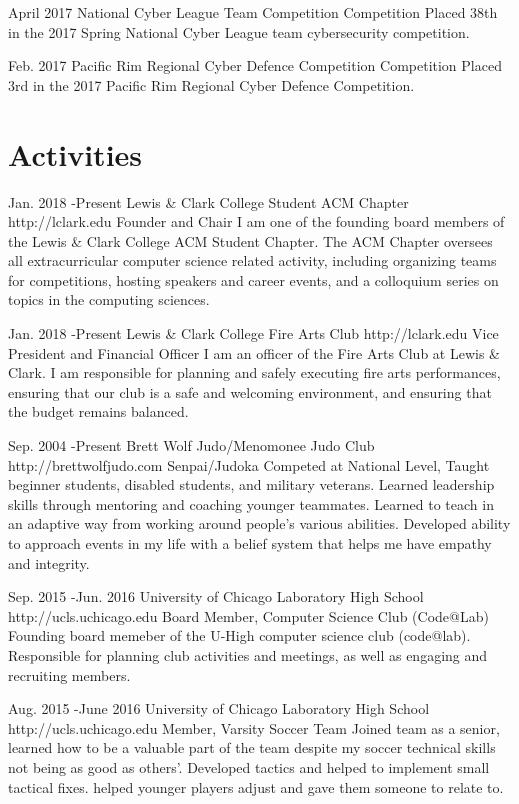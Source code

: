 \documentclass[10pt]{article} %
\begin{document}
\award
{April 2017}
{ }
{National Cyber League Team Competition}
{}
{Competition}
{Placed 38th in the 2017 Spring National Cyber League team cybersecurity competition.}

\award
{Feb. 2017}
{ }
{Pacific Rim Regional Cyber Defence Competition}
{}
{Competition}
{Placed 3rd in the 2017 Pacific Rim Regional Cyber Defence Competition.}

\section{Activities}
\activity
{Jan. 2018 -}{Present}
{Lewis \& Clark College Student ACM Chapter}
{http://lclark.edu}
{Founder and Chair}
{I am one of the founding board members of the Lewis \& Clark College ACM Student Chapter. The ACM Chapter oversees all extracurricular computer science related activity, including organizing teams for competitions, hosting speakers and career events, and a colloquium series on topics in the computing sciences.}


\activity
{Jan. 2018 -}{Present}
{Lewis \& Clark College Fire Arts Club}
{http://lclark.edu}
{Vice President and Financial Officer}
{I am an officer of the Fire Arts Club at Lewis \& Clark. I am responsible for planning and safely executing fire arts performances, ensuring that our club is a safe and welcoming environment, and ensuring that the budget remains balanced.}


\activity
{Sep. 2004 -}{Present}
{Brett Wolf Judo/Menomonee Judo Club}
{http://brettwolfjudo.com}
{Senpai/Judoka}
{Competed at National Level, Taught beginner students, disabled students, and military veterans. Learned leadership skills through mentoring and coaching younger teammates.  Learned to teach in an adaptive way from working around people’s various abilities. Developed ability to approach events in my life with a belief system that helps me have empathy and integrity.}

\activity
{Sep. 2015 -}{Jun. 2016}
{University of Chicago Laboratory High School}
{http://ucls.uchicago.edu}
{Board Member, Computer Science Club (Code@Lab)}
{Founding board memeber of the U-High computer science club (code@lab). Responsible for planning club activities and meetings, as well as engaging and recruiting members.}

\activity
{Aug. 2015 -}{June 2016}
{University of Chicago Laboratory High School}
{http://ucls.uchicago.edu}
{Member, Varsity Soccer Team}
{Joined team as a senior, learned how to be a valuable part of the team despite my soccer technical skills not being as good as others’. Developed tactics and helped to implement small tactical fixes. helped younger players adjust and gave  them someone to relate to.}
\end{document}
